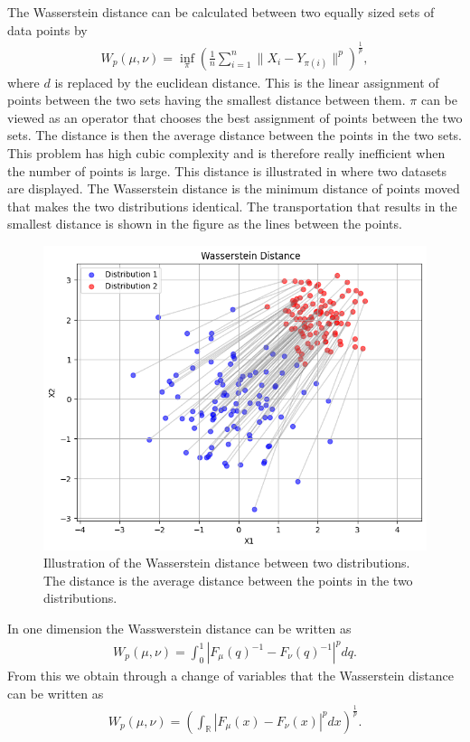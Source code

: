 The Wasserstein distance can be calculated between two equally sized sets of data points by
\begin{align*}
    W_p(\mu,\nu) =  \inf_{\pi} \left( \frac{1}{n} \sum_{i=1}^n \| X_i - Y_{\pi(i)}  \|^p \right)^{\frac{1}{p}},
\end{align*} 
where $d$ is replaced by the euclidean distance. This is the linear assignment of points between the two sets having the smallest distance between them. $\pi$ can be viewed as an operator that chooses the best assignment of points between the two sets. The distance is then the average distance between the points in the two sets. This problem has high cubic complexity and is therefore really inefficient when the number of points is large. This distance is illustrated in  where two datasets are displayed. The Wasserstein distance is the minimum distance of points moved that makes the two distributions identical. The transportation that results in the smallest distance is shown in the figure as the lines between the points. 
\begin{figure}
    \centering
    \includegraphics[width=0.5\linewidth]{3Theory/pictures/WassersteinIllustrated.png}
    \caption{Illustration of the Wasserstein distance between two distributions. The distance is the average distance between the points in the two distributions.}
    \label{fig:WassersteinDistance}
\end{figure}


In one dimension the Wasswerstein distance can be written as 
\begin{align*}
    W_p(\mu,\nu) = \int_{0}^1 |F_\mu(q)^{-1} - F_\nu(q)^{-1}|^p dq.
\end{align*}
From this we obtain through a change of variables that the Wasserstein distance can be written as
\begin{align*}
    W_p(\mu,\nu) = \left( \int_{\mathbb{R}} |F_\mu(x) - F_\nu(x)|^p dx \right)^{\frac{1}{p}}. 
\end{align*}

